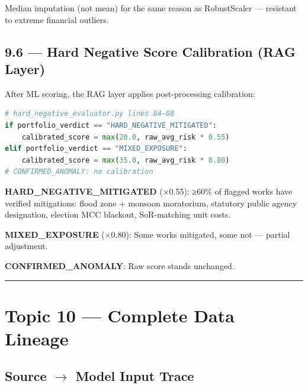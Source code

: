 \documentclass[11pt,a4paper]{article}
\begin{document}
Median imputation (not mean) for the same reason as RobustScaler --- resistant to extreme financial outliers.

\subsection{9.6 --- Hard Negative Score Calibration (RAG Layer)}

After ML scoring, the RAG layer applies post-processing calibration:

\begin{lstlisting}[language=Python]
# hard_negative_evaluator.py lines 84–88
if portfolio_verdict == "HARD_NEGATIVE_MITIGATED":
    calibrated_score = max(20.0, raw_avg_risk * 0.55)
elif portfolio_verdict == "MIXED_EXPOSURE":
    calibrated_score = max(35.0, raw_avg_risk * 0.80)
# CONFIRMED_ANOMALY: no calibration
\end{lstlisting}


\textbf{HARD\_NEGATIVE\_MITIGATED} (×0.55): ≥60\% of flagged works have verified mitigations: flood zone + monsoon moratorium, statutory public agency designation, election MCC blackout, SoR-matching unit costs.

\textbf{MIXED\_EXPOSURE} (×0.80): Some works mitigated, some not --- partial adjustment.

\textbf{CONFIRMED\_ANOMALY}: Raw score stands unchanged.

\vspace{1em}\hrule\vspace{1em}

\section{Topic 10 --- Complete Data Lineage}

\subsection{Source $\rightarrow$ Model Input Trace}
\end{document}
